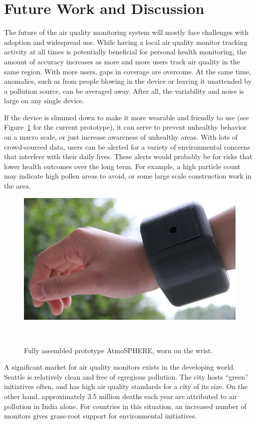 \documentclass{sigchi}
\begin{document}
\section{Future Work and Discussion}
The future of the air quality monitoring system will mostly face challenges with adoption and widespread use.
While having a local air quality monitor tracking activity at all times is potentially beneficial for personal health monitoring, the amount of accuracy increases as more and more users track air quality in the same region.
With more users, gaps in coverage are overcome.
At the same time, anomalies, such as from people blowing in the device or leaving it unattended by a pollution source, can be averaged away.
After all, the variability and noise is large on any single device.

If the device is slimmed down to make it more wearable and friendly to use (see Figure~\ref{fig:device worn} for the current prototype), it can serve to prevent unhealthy behavior on a macro scale, or just increase awareness of unhealthy areas.
With lots of crowd-sourced data, users can be alerted for a variety of environmental concerns that interfere with their daily lives.
These alerts would probably be for risks that lower health outcomes over the long term.
For example, a high particle count may indicate high pollen areas to avoid, or some large scale construction work in the area.
\begin{figure}
    \centering
    \includegraphics[width=0.9\columnwidth]{figures/Device-Worn.jpg}
    \caption{Fully assembled prototype AtmoSPHERE, worn on the wrist.}
    ~\label{fig:device worn}
\end{figure}

A significant market for air quality monitors exists in the developing world.
Seattle is relatively clean and free of egregious pollution.
The city hosts ``green'' initiatives often, and has high air quality standards for a city of its size.
On the other hand, approximately 3.5 million deaths each year are attributed to air pollution in India alone\cite{AirPollution:Article}.
For countries in this situation, an increased number of monitors gives grass-root support for environmental initiatives.
\end{document}
